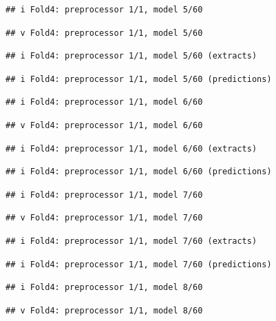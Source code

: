 \documentclass[
]{article}
\begin{document}
\begin{verbatim}
## i Fold4: preprocessor 1/1, model 5/60
\end{verbatim}

\begin{verbatim}
## v Fold4: preprocessor 1/1, model 5/60
\end{verbatim}

\begin{verbatim}
## i Fold4: preprocessor 1/1, model 5/60 (extracts)
\end{verbatim}

\begin{verbatim}
## i Fold4: preprocessor 1/1, model 5/60 (predictions)
\end{verbatim}

\begin{verbatim}
## i Fold4: preprocessor 1/1, model 6/60
\end{verbatim}

\begin{verbatim}
## v Fold4: preprocessor 1/1, model 6/60
\end{verbatim}

\begin{verbatim}
## i Fold4: preprocessor 1/1, model 6/60 (extracts)
\end{verbatim}

\begin{verbatim}
## i Fold4: preprocessor 1/1, model 6/60 (predictions)
\end{verbatim}

\begin{verbatim}
## i Fold4: preprocessor 1/1, model 7/60
\end{verbatim}

\begin{verbatim}
## v Fold4: preprocessor 1/1, model 7/60
\end{verbatim}

\begin{verbatim}
## i Fold4: preprocessor 1/1, model 7/60 (extracts)
\end{verbatim}

\begin{verbatim}
## i Fold4: preprocessor 1/1, model 7/60 (predictions)
\end{verbatim}

\begin{verbatim}
## i Fold4: preprocessor 1/1, model 8/60
\end{verbatim}

\begin{verbatim}
## v Fold4: preprocessor 1/1, model 8/60
\end{verbatim}
\end{document}
